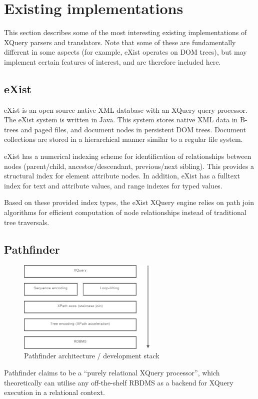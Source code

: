 \section{Existing implementations}
\label{sect:existing_implementations}

This section describes some of the most interesting existing implementations of
XQuery parsers and translators. Note that some of these are fundamentally
different in some aspects (for example, eXist operates on DOM trees), but may
implement certain features of interest, and are therefore included here.

\subsection{eXist}
eXist\cite{exist_doc} is an open source native XML database with an XQuery
query processor. The eXist system is written in Java. This system stores native
XML data in B-trees and paged files, and document nodes
in persistent DOM trees\cite{exist_factsheet}. Document collections are stored
in a hierarchical manner similar to a regular file system.

eXist has a numerical indexing scheme for identification of relationships
between nodes (parent/child, ancestor/descendant, previous/next sibling). This
provides a structural index for element attribute nodes. In addition, eXist has
a fulltext index for text and attribute values, and range indexes for typed
values.

Based on these provided index types, the eXist XQuery engine relies on path
join algorithms\cite{exist_idx_drv_query} for efficient computation of node
relationships instead of traditional tree traversals. 

\subsection{Pathfinder}
\label{sect:theory:pathfinder}
\begin{figure}[h]
  \centering
    \includegraphics[width=0.6\textwidth]{diagrams/pathfinder_arch}
  \caption{Pathfinder architecture / development stack \label{fig:theory:pathFinderStack}}
\end{figure}
Pathfinder\cite{pathfinderHome} claims to be a ``purely relational XQuery
processor'', which theoretically can utilise any off-the-shelf RBDMS as a
backend for XQuery execution in a relational context.

